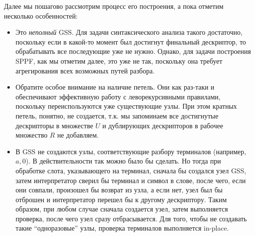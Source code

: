\begin{example}
\begin{center}
  \end{center}
  
  Далее мы пошагово рассмотрим процесс его построения, а пока отметим несколько особенностей:
  
  \begin{itemize}
    \item Это \textit{неполный} GSS. Для задачи синтаксического анализа такого достаточно, поскольку если в какой-то момент был достигнут финальный дескриптор, то обрабатывать все последующие уже не нужно. Однако, для задачи построения SPPF, как мы отметим далее, это уже не так, поскольку она требует агрегирования всех возможных путей разбора.
  
    \item Обратите особое внимание на наличие петель. Они как раз-таки и обеспечивают эффективную работу с леворекурсивными правилами, поскольку переиспользуются уже существующие узлы. При этом кратных петель, понятно, не создается, т.к. мы запоминаем все достигнутые дескрипторы в множестве $ U $ и дублирующих дескрипторов в рабочее множество $ R $ не добавляем. 
  
    \item В GSS не создаются узлы, соответствующие разбору терминалов (например, $a, 0$). В действительности так можно было бы сделать. Но тогда при обработке слота, указывающего на терминал, сначала бы создался узел GSS, затем интерпретатор сверил бы терминал и символ в слове, после чего, если они совпали, произошел бы возврат из узла, а если нет, узел был бы отброшен и интерпретатор перешел бы к другому дескриптору. Таким образом, при любом случае сначала создается узел, затем выполняется проверка, после чего узел сразу отбрасывается. Для того, чтобы не создавать такие ``одноразовые'' узлы, проверка терминалов выполняется in-place.
  \end{itemize}
  

\end{example}
